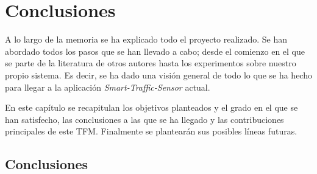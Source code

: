 \chapter{Conclusiones}\label{cap.conclusiones}

A lo largo de la memoria se ha explicado todo el proyecto realizado. Se han abordado todos los pasos que se han llevado a cabo; desde el comienzo en el que se parte de la literatura de otros autores hasta los experimentos sobre nuestro propio sistema. Es decir, se ha dado una visión general de todo lo que se ha hecho para llegar a la aplicación \textit{Smart-Traffic-Sensor} actual.

En este capítulo se recapitulan los objetivos planteados y el grado en el que se han satisfecho, las conclusiones a las que se ha llegado y las contribuciones principales de este TFM. Finalmente se plantearán sus posibles líneas futuras.

\section{Conclusiones}

